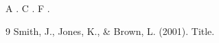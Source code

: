 \documentclass{article}
\begin{document}
A . C . F .
\begin{thebibliography}{9}
 Smith, J., Jones, K., \& Brown, L. (2001). Title.
\end{thebibliography}
\end{document}
